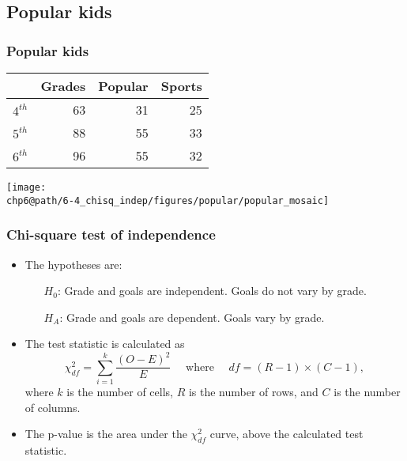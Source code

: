 \documentclass[slidestop,compress,mathserif]{beamer}
\makeatletter
\def\chp6@path{../../Chp 6}
\makeatother
\begin{document}
\subsection{Popular kids}


\begin{frame}
\frametitle{Popular kids}


{
\begin{center}
\begin{tabular}{rrrr}
  \hline
 & Grades & Popular & Sports \\ 
  \hline
$4^{th}$ &  63 &  31 &  25 \\ 
$5^{th}$ &  88 &  55 &  33 \\ 
$6^{th}$ &  96 &  55 &  32 \\ 
   \hline
\end{tabular}
\end{center}
}
{
\begin{center}
\texttt{[image: \\chp6@path/6-4\_chisq\_indep/figures/popular/popular\_mosaic]}
\end{center}
}


\end{frame}


\begin{frame}
\frametitle{Chi-square test of independence}

\begin{itemize}
\item The hypotheses are:
\begin{itemize}
\item[$H_0$:] Grade and goals are independent. Goals do not vary by grade.
\item[$H_A$:] Grade and goals are dependent. Goals vary by grade.
\end{itemize}

\pause

\item The test statistic is calculated as
\[ \chi^2_{df} = \sum_{i = 1}^{k} \frac{(O - E)^2}{E} \quad \text{ where } \quad df = (R - 1) \times (C - 1), \]
where $k$ is the number of cells, $R$ is the number of rows, and $C$ is the number of columns.


\pause

\item The p-value is the area under the $\chi^2_{df}$ curve, above the calculated test statistic.

\end{itemize}


\end{frame}
\end{document}
